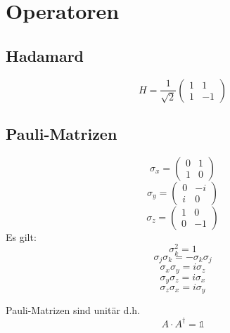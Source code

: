 \documentclass{article}
\begin{document}
\section{Operatoren}
\subsection{Hadamard}

\[ H = \frac{1}{\sqrt{2}}\left(\begin{array}{rr}
    1 &  1\\
    1 & -1
  \end{array}\right) \]
\subsection{Pauli-Matrizen}
\[ \sigma_x = \left(\begin{array}{rr}
    0 & 1\\
    1 & 0
  \end{array} \right) \]
\[ \sigma_y = \left(\begin{array}{rr}
    0 & -i\\
    i & 0
  \end{array} \right) \]
\[ \sigma_z = \left(\begin{array}{rr}
    1 & 0\\
    0 & -1
  \end{array}\right) \]
Es gilt:
\[ \sigma_k^2 = 1 \]
\[ \sigma_j\sigma_k = -\sigma_k\sigma_j \]
\[ \sigma_x\sigma_y = i\sigma_z \]
\[ \sigma_y\sigma_z = i\sigma_x \]
\[ \sigma_z\sigma_x = i\sigma_y \]

Pauli-Matrizen sind unitär d.h. 
\[ A \cdot A^{\dagger} = \mathbb{1} \]
  
\end{document}
